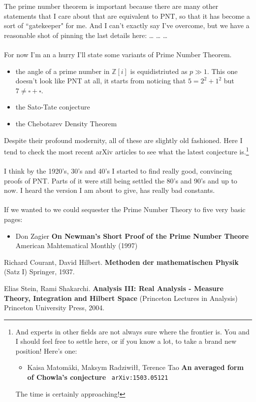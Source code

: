 \documentclass[12pt]{article}
\begin{document}
The prime number theorem is important because there are many other statements that I care about that are equivalent to PNT, so that it has become a sort of ``gatekeeper" for me.  And I can't exactly say I've overcome, but we have a reasonable shot of pinning the last details here: \dots \; \dots \; \dots \\ \\
For now I'm an a hurry I'll state some variants of Prime Number Theorem.  
\begin{itemize}
\item the angle of a prime number in $\mathbb{Z}[i]$ is equidistriuted as $p \gg 1$.  This one doesn't look like PNT at all, it starts from noticing that $5 = 2^2 + 1^2$ but $7 \neq \square + \square$. 
\item the Sato-Tate conjecture
\item the Chebotarev Density Theorem
\end{itemize}
Despite their profound modernity, all of these are slightly old fashioned.  Here I tend to check the most recent arXiv articles to see what the latest conjecture is.\footnote{And experts in other fields are not always sure where the frontier is.  You and I should feel free to settle here, or if you know a lot, to take a brand new position! Here's one:
\begin{itemize}
\item Kaisa Matom\"{a}ki, Maksym Radziwi\l\l, Terence Tao \textbf{An averaged form of Chowla's conjecture} \texttt{ arXiv:1503.05121}
\end{itemize}
The time is certainly approaching!
} \\ \\
I think by the 1920's, 30's and 40's I started to find really good, convincing proofs of PNT.  Parts of it were still being settled the 80's and 90's and up to now.  I heard the version I am about to give, has really bad constants.  \\ \\
If we wanted to we could sequester the Prime Number Theory to five very basic pages:
\begin{itemize}
\item Don Zagier \textbf{On Newman's Short Proof of the Prime Number Theore}  American Mahtematical Monthly (1997)
\end{itemize}


\newpage

\begin{thebibliography}{}

\item Richard Courant, David Hilbert.  \textbf{Methoden der mathematischen Physik} (Satz I) Springer, 1937. 

\item Elias Stein, Rami Shakarchi.   \textbf{Analysis III: Real Analysis - Measure Theory, Integration and Hilbert Space }(Princeton Lectures in Analysis) Princeton University Press, 2004.


\end{thebibliography}
\end{document}
